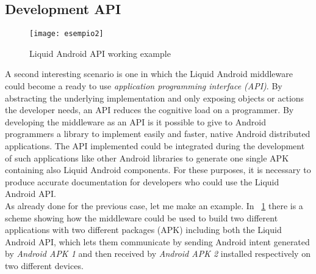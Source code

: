 \subsection{Development API}\label{devAPI}
\begin{figure}[h!]
	\centering
	\texttt{[image: esempio2]}
	\caption{Liquid Android API working example}
	\label{fig:3.4}
\end{figure}
 A second interesting scenario is one in which the Liquid Android middleware could become a ready to use \textit{application programming interface (API)}. By abstracting the underlying implementation and only exposing objects or actions the developer needs, an API reduces the cognitive load on a programmer. By developing the middleware as an API is it possible to give to Android programmers a library to implement easily and faster, native Android distributed applications. The API implemented could be integrated during the development of such applications like other Android libraries to generate one single APK containing also Liquid Android components. For these purposes, it is necessary to produce accurate documentation for developers who could use the Liquid Android API.\\
As already done for the previous case, let me make an example.
In \figurename~\ref{fig:3.4} there is a scheme showing how the middleware could be used to build two different applications with two different packages (APK) including both the Liquid Android API, which lets them communicate by sending Android intent generated by \textit{Android APK 1} and then received by \textit{Android APK 2} installed respectively on two different devices.

